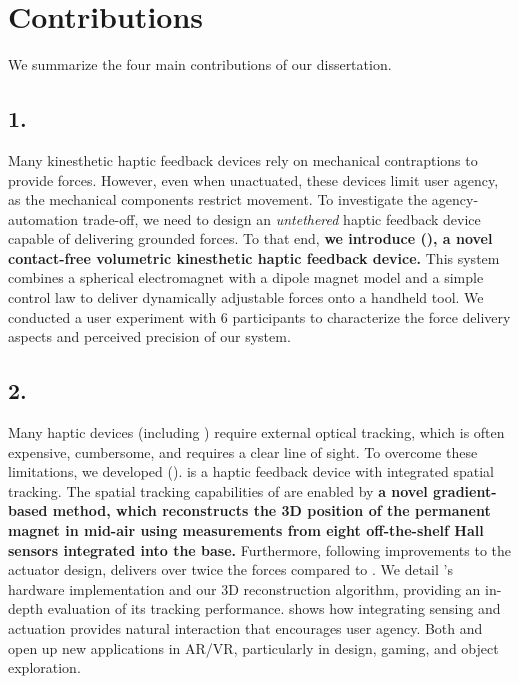 \chapter{Contributions}
We summarize the four main contributions of our dissertation.
\section*{1. \omniHapTitle}
Many kinesthetic haptic feedback devices rely on mechanical contraptions to provide forces. However, even when unactuated, these devices limit user agency, as the mechanical components restrict movement. To investigate the agency-automation trade-off, we need to design an \emph{untethered} haptic feedback device capable of delivering grounded forces. To that end, \textbf{we introduce \omniHap (), a novel contact-free volumetric kinesthetic haptic feedback device.} This system combines a spherical electromagnet with a dipole magnet model and a simple control law to deliver dynamically adjustable forces onto a handheld tool. We conducted a user experiment with 6 participants to characterize the force delivery aspects and perceived precision of our system.
\section*{2. \omniUISTTitle}
Many haptic devices (including \omniHap) require external optical tracking, which is often expensive, cumbersome, and requires a clear line of sight. To overcome these limitations, we developed \omniUIST (). \omniUIST is a haptic feedback device with integrated spatial tracking. The spatial tracking capabilities of \omniUIST are enabled by \textbf{a novel gradient-based method, which reconstructs the 3D position of the permanent magnet in mid-air using measurements from eight off-the-shelf Hall sensors integrated into the base.} Furthermore, following improvements to the actuator design, \omniUIST delivers over twice the forces compared to \omniHap. We detail \omniUIST's hardware implementation and our 3D reconstruction algorithm, providing an in-depth evaluation of its tracking performance. \omniUIST shows how integrating sensing and actuation provides natural interaction that encourages user agency. Both \omniHap and \omniUIST open up new applications in AR/VR, particularly in design, gaming, and object exploration.
